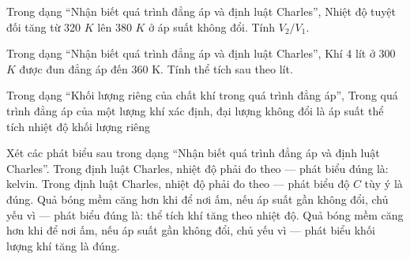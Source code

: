 \begin{bt}
Trong dạng “Nhận biết quá trình đẳng áp và định luật Charles”, Nhiệt độ tuyệt đối tăng từ 320 $K$ lên 380 $K$ ở áp suất không đổi. Tính $V_2/V_1$.
\end{bt}

\begin{ex}
Trong dạng “Nhận biết quá trình đẳng áp và định luật Charles”, Khí 4 lít ở 300 $K$ được đun đẳng áp đến 360 K. Tính thể tích sau theo lít.
\end{ex}

\begin{ex}
Trong dạng “Khối lượng riêng của chất khí trong quá trình đẳng áp”, Trong quá trình đẳng áp của một lượng khí xác định, đại lượng không đổi là
\choice
{\True áp suất}
{thể tích}
{nhiệt độ}
{khối lượng riêng}
\end{ex}

\begin{ex}
Xét các phát biểu sau trong dạng “Nhận biết quá trình đẳng áp và định luật Charles”.
\choiceTF
{\True Trong định luật Charles, nhiệt độ phải đo theo — phát biểu đúng là: kelvin.}
{Trong định luật Charles, nhiệt độ phải đo theo — phát biểu độ $C$ tùy ý là đúng.}
{\True Quả bóng mềm căng hơn khi để nơi ấm, nếu áp suất gần không đổi, chủ yếu vì — phát biểu đúng là: thể tích khí tăng theo nhiệt độ.}
{Quả bóng mềm căng hơn khi để nơi ấm, nếu áp suất gần không đổi, chủ yếu vì — phát biểu khối lượng khí tăng là đúng.}
\end{ex}

